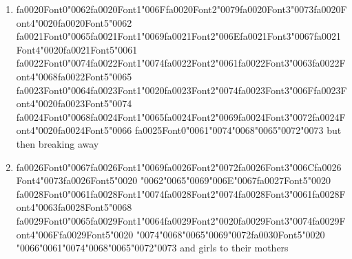 \documentclass[12pt]{article}
\begin{document}
\begin{enumerate}[label=\arabic*.]
\begin{enumerate}[label=(\alph*)]
    \item {\csname fa0020Font0\endcsname\char"0062}{\csname fa0020Font1\endcsname\char"006F}{\csname fa0020Font2\endcsname\char"0079}{\csname fa0020Font3\endcsname\char"0073}{\csname fa0020Font4\endcsname\char"0020}{\csname fa0020Font5\endcsname\char"0062} {\csname fa0021Font0\endcsname\char"0065}{\csname fa0021Font1\endcsname\char"0069}{\csname fa0021Font2\endcsname\char"006E}{\csname fa0021Font3\endcsname\char"0067}{\csname fa0021Font4\endcsname\char"0020}{\csname fa0021Font5\endcsname\char"0061} {\csname fa0022Font0\endcsname\char"0074}{\csname fa0022Font1\endcsname\char"0074}{\csname fa0022Font2\endcsname\char"0061}{\csname fa0022Font3\endcsname\char"0063}{\csname fa0022Font4\endcsname\char"0068}{\csname fa0022Font5\endcsname\char"0065} {\csname fa0023Font0\endcsname\char"0064}{\csname fa0023Font1\endcsname\char"0020}{\csname fa0023Font2\endcsname\char"0074}{\csname fa0023Font3\endcsname\char"006F}{\csname fa0023Font4\endcsname\char"0020}{\csname fa0023Font5\endcsname\char"0074} {\csname fa0024Font0\endcsname\char"0068}{\csname fa0024Font1\endcsname\char"0065}{\csname fa0024Font2\endcsname\char"0069}{\csname fa0024Font3\endcsname\char"0072}{\csname fa0024Font4\endcsname\char"0020}{\csname fa0024Font5\endcsname\char"0066} {\csname fa0025Font0\endcsname\char"0061}{\char"0074}{\char"0068}{\char"0065}{\char"0072}{\char"0073} but then breaking away
    \item {\csname fa0026Font0\endcsname\char"0067}{\csname fa0026Font1\endcsname\char"0069}{\csname fa0026Font2\endcsname\char"0072}{\csname fa0026Font3\endcsname\char"006C}{\csname fa0026Font4\endcsname\char"0073}{\csname fa0026Font5\endcsname\char"0020} {\char"0062}{\char"0065}{\char"0069}{\char"006E}{\char"0067}{\csname fa0027Font5\endcsname\char"0020} {\csname fa0028Font0\endcsname\char"0061}{\csname fa0028Font1\endcsname\char"0074}{\csname fa0028Font2\endcsname\char"0074}{\csname fa0028Font3\endcsname\char"0061}{\csname fa0028Font4\endcsname\char"0063}{\csname fa0028Font5\endcsname\char"0068} {\csname fa0029Font0\endcsname\char"0065}{\csname fa0029Font1\endcsname\char"0064}{\csname fa0029Font2\endcsname\char"0020}{\csname fa0029Font3\endcsname\char"0074}{\csname fa0029Font4\endcsname\char"006F}{\csname fa0029Font5\endcsname\char"0020} {\char"0074}{\char"0068}{\char"0065}{\char"0069}{\char"0072}{\csname fa0030Font5\endcsname\char"0020} {\char"0066}{\char"0061}{\char"0074}{\char"0068}{\char"0065}{\char"0072}{\char"0073} and girls to their mothers

\end{enumerate}
\end{enumerate}
\end{document}

